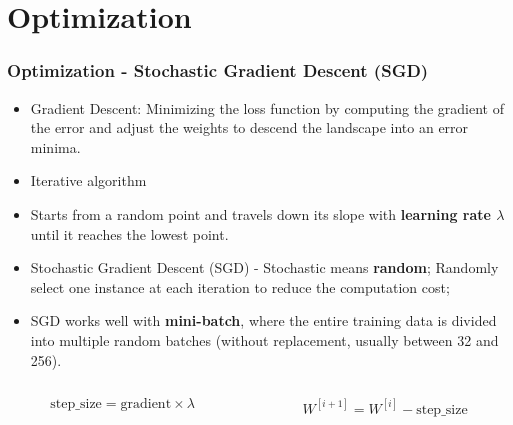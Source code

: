 \documentclass[aspectratio=169, 10pt]{beamer}
\begin{document}
\section{Optimization}
\begin{frame}
    \frametitle{Optimization - Stochastic Gradient Descent (SGD)}
    \small
    
    \begin{itemize}
        \item Gradient Descent: Minimizing the loss function by computing the gradient of the error and adjust the weights to descend the landscape into an error minima.
        \item Iterative algorithm
        \item Starts from a random point and travels down its slope with \textbf{learning rate $\lambda$} until it reaches the lowest point.
        \item Stochastic Gradient Descent (SGD) - Stochastic means \textbf{random}; Randomly select one instance at each iteration to reduce the computation cost;
        \item SGD works well with \textbf{mini-batch}, where the entire training data is divided into multiple random batches (without replacement, usually between 32 and 256).
    \end{itemize}
    
    \begin{figure}
        \centering
    \end{figure}
    \begin{columns}
        \begin{column}{0.5\textwidth}
            \[
                \text{step\_size} = \text{gradient} \times \lambda
            \]
        \end{column}
        \begin{column}{0.5\textwidth}
            \[
                W^{[i+1]} = W^{[i]} - \text{step\_size}
            \]
        \end{column}
    \end{columns}

\end{frame}
\end{document}
